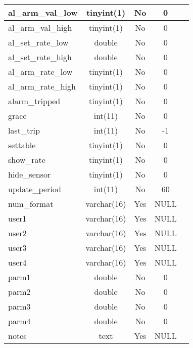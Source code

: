 \begin{longtable}{|l|c|c|c|l|}
al\_arm\_val\_low & tinyint(1) & No & 0 \\ \hline 
al\_arm\_val\_high & tinyint(1) & No & 0 \\ \hline 
al\_set\_rate\_low & double & No & 0 \\ \hline 
al\_set\_rate\_high & double & No & 0 \\ \hline 
al\_arm\_rate\_low & tinyint(1) & No & 0 \\ \hline 
al\_arm\_rate\_high & tinyint(1) & No & 0 \\ \hline 
alarm\_tripped & tinyint(1) & No & 0 \\ \hline 
grace & int(11) & No & 0 \\ \hline 
last\_trip & int(11) & No & -1 \\ \hline 
settable & tinyint(1) & No & 0 \\ \hline 
show\_rate & tinyint(1) & No & 0 \\ \hline 
hide\_sensor & tinyint(1) & No & 0 \\ \hline 
update\_period & int(11) & No & 60 \\ \hline 
num\_format & varchar(16) & Yes & NULL \\ \hline 
user1 & varchar(16) & Yes & NULL \\ \hline 
user2 & varchar(16) & Yes & NULL \\ \hline 
user3 & varchar(16) & Yes & NULL \\ \hline 
user4 & varchar(16) & Yes & NULL \\ \hline 
parm1 & double & No & 0 \\ \hline 
parm2 & double & No & 0 \\ \hline 
parm3 & double & No & 0 \\ \hline 
parm4 & double & No & 0 \\ \hline 
notes & text & Yes & NULL \\ \hline 
 \end{longtable}

